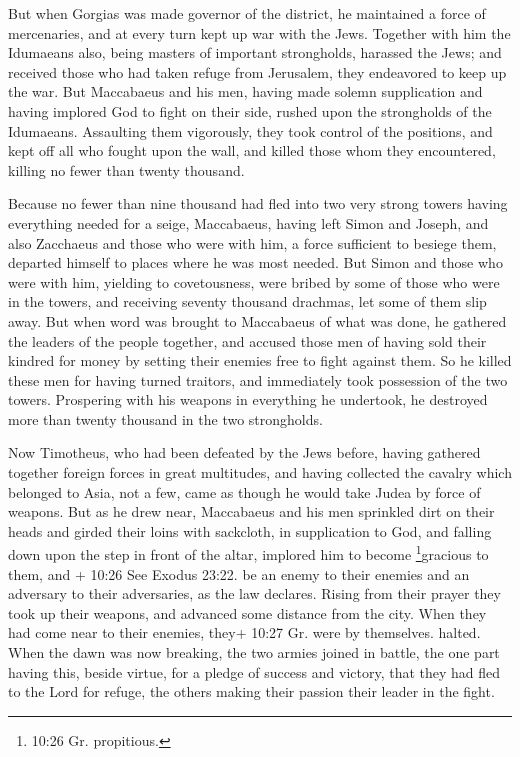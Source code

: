  But when Gorgias was made governor of the district, he
maintained a force of mercenaries, and at every turn kept up war with
the Jews.  Together with him the Idumaeans also, being
masters of important strongholds, harassed the Jews; and received those
who had taken refuge from Jerusalem, they endeavored to keep up the war.
 But Maccabaeus and his men, having made solemn
supplication and having implored God to fight on their side, rushed upon
the strongholds of the Idumaeans.  Assaulting them
vigorously, they took control of the positions, and kept off all who
fought upon the wall, and killed those whom they encountered, killing no
fewer than twenty thousand.

 Because no fewer than nine thousand had fled into two very
strong towers having everything needed for a seige, 
Maccabaeus, having left Simon and Joseph, and also Zacchaeus and those
who were with him, a force sufficient to besiege them, departed himself
to places where he was most needed.  But Simon and those
who were with him, yielding to covetousness, were bribed by some of
those who were in the towers, and receiving seventy thousand drachmas,
let some of them slip away.  But when word was brought to
Maccabaeus of what was done, he gathered the leaders of the people
together, and accused those men of having sold their kindred for money
by setting their enemies free to fight against them.  So he
killed these men for having turned traitors, and immediately took
possession of the two towers.  Prospering with his weapons
in everything he undertook, he destroyed more than twenty thousand in
the two strongholds.

 Now Timotheus, who had been defeated by the Jews before,
having gathered together foreign forces in great multitudes, and having
collected the cavalry which belonged to Asia, not a few, came as though
he would take Judea by force of weapons.  But as he drew
near, Maccabaeus and his men sprinkled dirt on their heads and girded
their loins with sackcloth, in supplication to God,  and
falling down upon the step in front of the altar, implored him to become
\footnote{10:26 Gr. propitious.}gracious to them, and + 10:26 See Exodus
23:22. be an enemy to their enemies and an adversary to their
adversaries, as the law declares.  Rising from their prayer
they took up their weapons, and advanced some distance from the city.
When they had come near to their enemies, they+ 10:27 Gr. were by
themselves. halted.  When the dawn was now breaking, the
two armies joined in battle, the one part having this, beside virtue,
for a pledge of success and victory, that they had fled to the Lord for
refuge, the others making their passion their leader in the fight.

